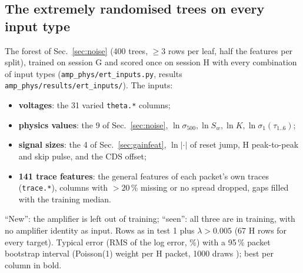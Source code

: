 \documentclass[10pt,a4paper]{article}
\newcommand{\code}[1]{\texttt{\small #1}}
\begin{document}
\subsection{The extremely randomised trees on every input type}\label{app:ertinputs}
The forest of Sec.~\ref{sec:noise} (400 trees, $\ge3$ rows per leaf, half the features per split), trained on session G and
scored once on session H with every combination of input types (\code{amp\_phys/ert\_inputs.py}, results
\code{amp\_phys/results/ert\_inputs/}). The inputs:
\begin{itemize}
\item \textbf{voltages}: the 31 varied \code{theta.*} columns;
\item \textbf{physics values}: the 9 of Sec.~\ref{sec:noise}, $\ln\sigma_{500},\ln S_w,\ln K,\ln\sigma_1(\tau_{1..6})$;
\item \textbf{signal sizes}: the 4 of Sec.~\ref{sec:gainfeat}, $\ln|\cdot|$ of reset jump, H peak-to-peak and skip pulse, and the CDS offset;
\item \textbf{141 trace features}: the general features of each packet's own traces (\code{trace.*}), columns with $>20$\,\% missing
  or no spread dropped, gaps filled with the training median.
\end{itemize}
``New'': the amplifier is left out of training; ``seen'': all three are in training, with no amplifier identity as input.
Rows as in test 1 plus $\lambda>0.005$ (67 H rows for every target). Typical error (RMS of the log error, \%) with a 95\,\%
packet bootstrap interval (Poisson(1) weight per H packet, 1000 draws \cite{efron1979,hanley2006}); best per column in bold.
\end{document}
